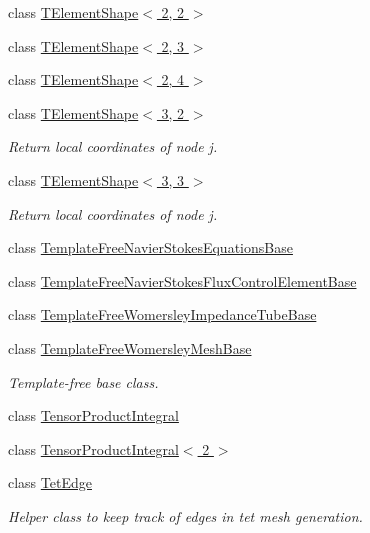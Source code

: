 \begin{DoxyCompactItemize}
class \hyperlink{classoomph_1_1TElementShape_3_012_00_012_01_4}{T\+Element\+Shape$<$ 2, 2 $>$}
\item 
class \hyperlink{classoomph_1_1TElementShape_3_012_00_013_01_4}{T\+Element\+Shape$<$ 2, 3 $>$}
\item 
class \hyperlink{classoomph_1_1TElementShape_3_012_00_014_01_4}{T\+Element\+Shape$<$ 2, 4 $>$}
\item 
class \hyperlink{classoomph_1_1TElementShape_3_013_00_012_01_4}{T\+Element\+Shape$<$ 3, 2 $>$}
\begin{DoxyCompactList}\small\item\em Return local coordinates of node j. \end{DoxyCompactList}\item 
class \hyperlink{classoomph_1_1TElementShape_3_013_00_013_01_4}{T\+Element\+Shape$<$ 3, 3 $>$}
\begin{DoxyCompactList}\small\item\em Return local coordinates of node j. \end{DoxyCompactList}\item 
class \hyperlink{classoomph_1_1TemplateFreeNavierStokesEquationsBase}{Template\+Free\+Navier\+Stokes\+Equations\+Base}
\item 
class \hyperlink{classoomph_1_1TemplateFreeNavierStokesFluxControlElementBase}{Template\+Free\+Navier\+Stokes\+Flux\+Control\+Element\+Base}
\item 
class \hyperlink{classoomph_1_1TemplateFreeWomersleyImpedanceTubeBase}{Template\+Free\+Womersley\+Impedance\+Tube\+Base}
\item 
class \hyperlink{classoomph_1_1TemplateFreeWomersleyMeshBase}{Template\+Free\+Womersley\+Mesh\+Base}
\begin{DoxyCompactList}\small\item\em Template-\/free base class. \end{DoxyCompactList}\item 
class \hyperlink{classoomph_1_1TensorProductIntegral}{Tensor\+Product\+Integral}
\item 
class \hyperlink{classoomph_1_1TensorProductIntegral_3_012_01_4}{Tensor\+Product\+Integral$<$ 2 $>$}
\item 
class \hyperlink{classoomph_1_1TetEdge}{Tet\+Edge}
\begin{DoxyCompactList}\small\item\em Helper class to keep track of edges in tet mesh generation. \end{DoxyCompactList}\item 

\end{DoxyCompactItemize}
